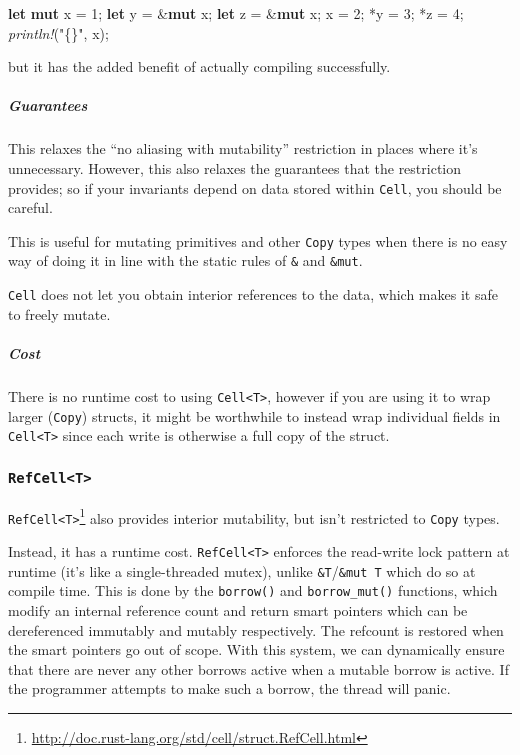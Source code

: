 \documentclass[a4paper,]{book}
\newenvironment{Shaded}{\begin{snugshade}}{\end{snugshade}}
\newcommand{\KeywordTok}[1]{\textcolor[rgb]{0.13,0.29,0.53}{\textbf{{#1}}}}
\newcommand{\DecValTok}[1]{\textcolor[rgb]{0.00,0.00,0.81}{{#1}}}
\newcommand{\StringTok}[1]{\textcolor[rgb]{0.31,0.60,0.02}{{#1}}}
\newcommand{\PreprocessorTok}[1]{\textcolor[rgb]{0.56,0.35,0.01}{\textit{{#1}}}}
\newcommand{\NormalTok}[1]{{#1}}
\renewcommand{\href}[2]{#2\footnote{\url{#1}}}
\let\oldsubparagraph\subparagraph
\renewcommand{\subparagraph}[1]{\oldsubparagraph{#1}\mbox{}}
\begin{document}
\begin{Shaded}
\begin{Highlighting}[]
\KeywordTok{let} \KeywordTok{mut} \NormalTok{x = }\DecValTok{1}\NormalTok{;}
\KeywordTok{let} \NormalTok{y = &}\KeywordTok{mut} \NormalTok{x;}
\KeywordTok{let} \NormalTok{z = &}\KeywordTok{mut} \NormalTok{x;}
\NormalTok{x = }\DecValTok{2}\NormalTok{;}
\NormalTok{*y = }\DecValTok{3}\NormalTok{;}
\NormalTok{*z = }\DecValTok{4}\NormalTok{;}
\PreprocessorTok{println!}\NormalTok{(}\StringTok{"\{\}"}\NormalTok{, x);}
\end{Highlighting}
\end{Shaded}

but it has the added benefit of actually compiling successfully.

\subparagraph{Guarantees}\label{guarantees-1}

This relaxes the ``no aliasing with mutability'' restriction in places
where it's unnecessary. However, this also relaxes the guarantees that
the restriction provides; so if your invariants depend on data stored
within \texttt{Cell}, you should be careful.

This is useful for mutating primitives and other \texttt{Copy} types
when there is no easy way of doing it in line with the static rules of
\texttt{\&} and \texttt{\&mut}.

\texttt{Cell} does not let you obtain interior references to the data,
which makes it safe to freely mutate.

\subparagraph{Cost}\label{cost-1}

There is no runtime cost to using
\texttt{Cell\textless{}T\textgreater{}}, however if you are using it to
wrap larger (\texttt{Copy}) structs, it might be worthwhile to instead
wrap individual fields in \texttt{Cell\textless{}T\textgreater{}} since
each write is otherwise a full copy of the struct.

\subsubsection{\texorpdfstring{\texttt{RefCell\textless{}T\textgreater{}}}{RefCell\textless{}T\textgreater{}}}\label{refcellt}

\href{http://doc.rust-lang.org/std/cell/struct.RefCell.html}{\texttt{RefCell\textless{}T\textgreater{}}}
also provides interior mutability, but isn't restricted to \texttt{Copy}
types.

Instead, it has a runtime cost.
\texttt{RefCell\textless{}T\textgreater{}} enforces the read-write lock
pattern at runtime (it's like a single-threaded mutex), unlike
\texttt{\&T}/\texttt{\&mut\ T} which do so at compile time. This is done
by the \texttt{borrow()} and \texttt{borrow\_mut()} functions, which
modify an internal reference count and return smart pointers which can
be dereferenced immutably and mutably respectively. The refcount is
restored when the smart pointers go out of scope. With this system, we
can dynamically ensure that there are never any other borrows active
when a mutable borrow is active. If the programmer attempts to make such
a borrow, the thread will panic.
\end{document}
